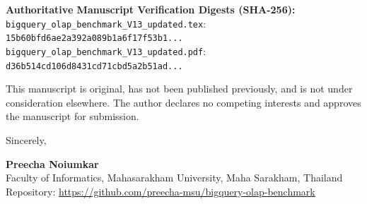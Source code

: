 \documentclass[11pt,a4paper]{article}
\begin{document}
\textbf{Authoritative Manuscript Verification Digests (SHA-256):}\\
\texttt{bigquery\_olap\_benchmark\_V13\_updated.tex}: \texttt{15b60bfd6ae2a392a089b1a6f17f53b1...}\\
\texttt{bigquery\_olap\_benchmark\_V13\_updated.pdf}: \texttt{d36b514cd106d8431cd71cbd5a2b51ad...}

This manuscript is original, has not been published previously, and is not under consideration elsewhere. The author declares no competing interests and approves the manuscript for submission.

Sincerely,

\textbf{Preecha Noiumkar}\\
Faculty of Informatics, Mahasarakham University, Maha Sarakham, Thailand\\
Repository: \url{https://github.com/preecha-msu/bigquery-olap-benchmark}
\end{document}
